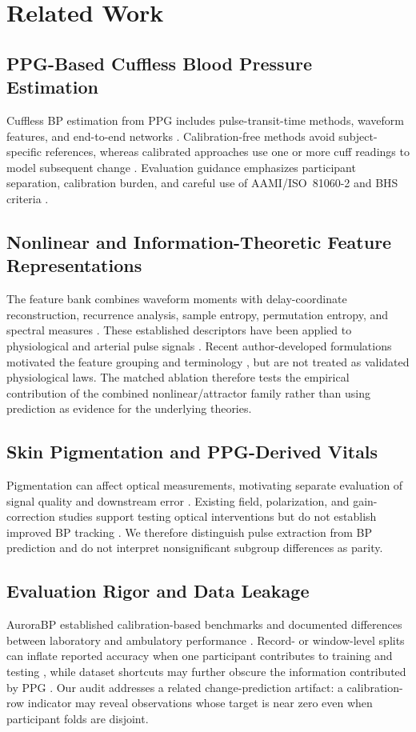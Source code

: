 \documentclass[12pt]{article}
\let\cite\citep
\begin{document}
\section{Related Work}
\label{sec:related}
\subsection{PPG-Based Cuffless Blood Pressure Estimation}
Cuffless BP estimation from PPG includes pulse-transit-time methods, waveform features, and end-to-end networks \cite{elgendi2019ppg,mukkamala2015toward}. Calibration-free methods avoid subject-specific references, whereas calibrated approaches use one or more cuff readings to model subsequent change \cite{calfree2023,onetimecal2023,avct2026}. Evaluation guidance emphasizes participant separation, calibration burden, and careful use of AAMI/ISO~81060-2 and BHS criteria \cite{recommendations2024}.
\subsection{Nonlinear and Information-Theoretic Feature Representations}
The feature bank combines waveform moments with delay-coordinate reconstruction, recurrence analysis, sample entropy, permutation entropy, and spectral measures \cite{takens1981,eckmann1987,marwan2007,richman2000,bandt2002}. These established descriptors have been applied to physiological and arterial pulse signals \cite{allen2007ppg,attractorpulse2022}. Recent author-developed formulations motivated the feature grouping and terminology \cite{cst2026,avct2026,adt2026}, but are not treated as validated physiological laws. The matched ablation therefore tests the empirical contribution of the combined nonlinear/attractor family rather than using prediction as evidence for the underlying theories.
\subsection{Skin Pigmentation and PPG-Derived Vitals}
Pigmentation can affect optical measurements, motivating separate evaluation of signal quality and downstream error \cite{jmir2024,fitzpatrick2024,phantom2026,montecarlo2026}. Existing field, polarization, and gain-correction studies support testing optical interventions but do not establish improved BP tracking \cite{equity2026,polarimetric2026,gaincorrection2025}. We therefore distinguish pulse extraction from BP prediction and do not interpret nonsignificant subgroup differences as parity.
\subsection{Evaluation Rigor and Data Leakage}
AuroraBP established calibration-based benchmarks and documented differences between laboratory and ambulatory performance \cite{aurorabp2022}. Record- or window-level splits can inflate reported accuracy when one participant contributes to training and testing \cite{bpbenchmark2023,mimicbp2024}, while dataset shortcuts may further obscure the information contributed by PPG \cite{limitations2024,challenges2024}. Our audit addresses a related change-prediction artifact: a calibration-row indicator may reveal observations whose target is near zero even when participant folds are disjoint.
\end{document}

